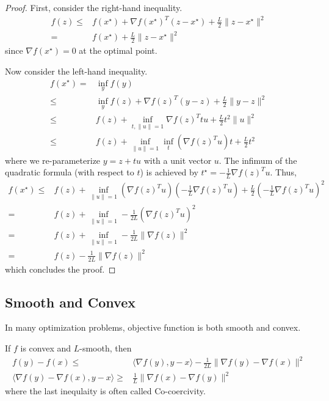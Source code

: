 \documentclass{article}
\begin{document}
\begin{proof}
    First, consider the right-hand inequality.
    \begin{align}
        f(z) \leq& f(x^\star) + \nabla f(x^\star)^T (z-x^\star) + \frac{L}{2}\|z-x^\star\|^2\\
        =& f(x^\star) + \frac{L}{2}\|z-x^\star\|^2
    \end{align}
    since $\nabla f(x^\star) = 0$ at the optimal point.

    Now consider the left-hand inequality.
    \begin{align}
        f(x^\star) =& \inf_y f(y)\\
        \leq& \inf_y f(z) + \nabla f(z)^T (y-z) + \frac{L}{2} \|y-z\|^2\\
        \leq& f(z) + \inf_{t, \|u\|=1} \nabla f(z)^T tu + \frac{L}{2} t^2\|u\|^2\\
        \leq& f(z) + \inf_{\|u\|=1} \inf_t (\nabla f(z)^T u) t + \frac{L}{2} t^2
    \end{align}
    where we re-parameterize $y = z + t u$ with a unit vector $u$.
    The infimum of the quadratic formula (with respect to $t$) is achieved by $t^\star = -\frac{1}{L}\nabla f(z)^T u$.
    Thus, 
    \begin{align}
        f(x^\star)
        \leq& f(z) + \inf_{\|u\|=1} (\nabla f(z)^T u) \left(-\frac{1}{L} \nabla f(z)^T u\right) + \frac{L}{2} \left(-\frac{1}{L} \nabla f(z)^T u\right)^2\\
        =& f(z) + \inf_{\|u\|=1} -\frac{1}{2L} \left(\nabla f(z)^T u\right)^2\\
        =& f(z) + \inf_{\|u\|=1} -\frac{1}{2L}  \|\nabla f(z)\|^2\\
        =& f(z) -\frac{1}{2L}  \|\nabla f(z)\|^2
    \end{align}
    which concludes the proof.
\end{proof}


\subsection{Smooth and Convex}
In many optimization problems, objective function is both smooth and convex.
\begin{lemma}
    If $f$ is convex and $L$-smooth, then
    \begin{align}
        f(y) - f(x) \leq& \langle \nabla f(y) , y-x \rangle - \frac{1}{2L}\|\nabla f(y) - \nabla f(x)\|^2\label{eq:coercivity1}\\
        \langle \nabla f(y)- \nabla f(x) , y-x \rangle \geq& \frac{1}{L}\| \nabla f(x) - \nabla f(y)\|^2\label{eq:coercivity2}
    \end{align}
    where the last inequlaity is often called Co-coercivity.
\end{lemma}
\end{document}
